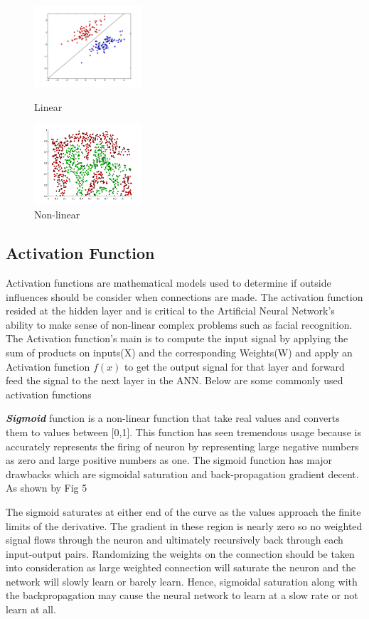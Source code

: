 \documentclass[journal]{IEEEtran}
\begin{document}
\begin{figure}[h]
\begin{minipage}{.22\textwidth}
  \centering
  \includegraphics[width=4cm]{linear}
  \caption{Linear}
\end{minipage}%
\begin{minipage}{.22\textwidth}
  \centering
  \includegraphics[width=4cm]{nonlinear}
  \caption{Non-linear}
\end{minipage}
\end{figure}

\subsection{Activation Function}
Activation functions are mathematical models used to determine if outside influences should be consider when connections are made.  The activation function resided at the hidden layer and is critical to the Artificial Neural Network's ability to make sense of non-linear complex problems such as facial recognition.  The Activation function's main is to compute the input signal by applying the sum of products on inputs(X) and the corresponding Weights(W) and apply an Activation function $f(x)$ to get the output signal for that layer and forward feed the signal to the next layer in the ANN.  Below are some commonly used activation functions

\hfill\break
\textbf{\textit{Sigmoid}} function is a non-linear function that take real values and converts them to values between [0,1].  This function has seen tremendous usage because is accurately represents the firing of neuron by representing large negative numbers as zero and large positive numbers as one.  The sigmoid function has major drawbacks which are sigmoidal saturation and back-propagation gradient decent.  As shown by Fig 5

\hfill\break
The sigmoid saturates at either end of the curve as the values approach the finite limits of the derivative.  The gradient in these region is nearly zero so no weighted signal flows through the neuron and ultimately recursively back through each input-output pairs.  Randomizing the weights on the connection should be taken into consideration as large weighted connection will saturate the neuron and the network will slowly learn or barely learn.  Hence, sigmoidal saturation along with the backpropagation may cause the neural network to learn at a slow rate or not learn at all.
\end{document}
